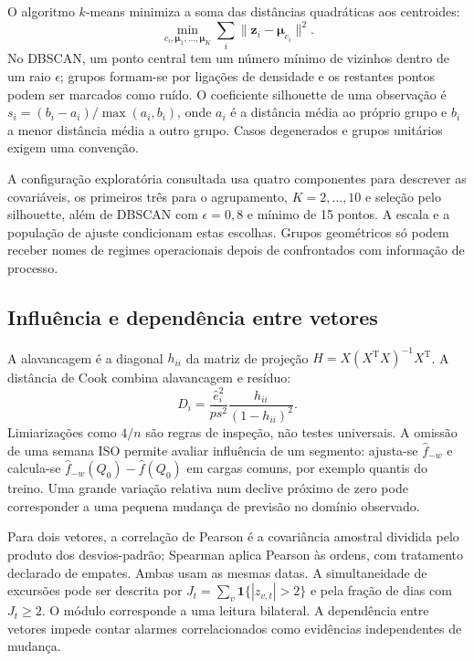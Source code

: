 O algoritmo $k$-means minimiza a soma das distâncias quadráticas aos centroides:
\begin{equation}
\min_{c_i,\boldsymbol\mu_1,\ldots,\boldsymbol\mu_K}
\sum_i\|\boldsymbol z_i-\boldsymbol\mu_{c_i}\|^2.
\label{eq:mat-kmeans}
\end{equation}
No DBSCAN, um ponto central tem um número mínimo de vizinhos dentro de um raio $\epsilon$; grupos formam-se por ligações de densidade e os restantes pontos podem ser marcados como ruído. O coeficiente silhouette de uma observação é $s_i=(b_i-a_i)/\max(a_i,b_i)$, onde $a_i$ é a distância média ao próprio grupo e $b_i$ a menor distância média a outro grupo. Casos degenerados e grupos unitários exigem uma convenção.

A configuração exploratória consultada usa quatro componentes para descrever as covariáveis, os primeiros três para o agrupamento, $K=2,\ldots,10$ e seleção pelo silhouette, além de DBSCAN com $\epsilon=0{,}8$ e mínimo de 15 pontos. A escala e a população de ajuste condicionam estas escolhas. Grupos geométricos só podem receber nomes de regimes operacionais depois de confrontados com informação de processo.

\subsection{Influência e dependência entre vetores}
\label{sec:mat-influencia}
A alavancagem é a diagonal $h_{ii}$ da matriz de projeção $H=X(X^{\mathrm T}X)^{-1}X^{\mathrm T}$. A distância de Cook combina alavancagem e resíduo:
\begin{equation}
D_i=\frac{\widehat e_i^2}{p s^2}\frac{h_{ii}}{(1-h_{ii})^2}.
\label{eq:mat-cook}
\end{equation}
Limiarizações como $4/n$ são regras de inspeção, não testes universais. A omissão de uma semana ISO permite avaliar influência de um segmento: ajusta-se $\widehat f_{-w}$ e calcula-se $\widehat f_{-w}(Q_0)-\widehat f(Q_0)$ em cargas comuns, por exemplo quantis do treino. Uma grande variação relativa num declive próximo de zero pode corresponder a uma pequena mudança de previsão no domínio observado.

Para dois vetores, a correlação de Pearson é a covariância amostral dividida pelo produto dos desvios-padrão; Spearman aplica Pearson às ordens, com tratamento declarado de empates. Ambas usam as mesmas datas. A simultaneidade de excursões pode ser descrita por $J_t=\sum_v\mathbf1\{|z_{v,t}|>2\}$ e pela fração de dias com $J_t\geq2$. O módulo corresponde a uma leitura bilateral. A dependência entre vetores impede contar alarmes correlacionados como evidências independentes de mudança.

